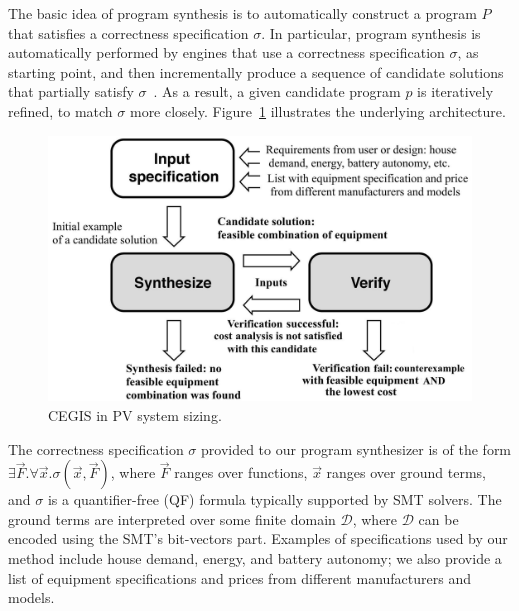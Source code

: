 \documentclass[runningheads]{llncs}
\begin{document}

The basic idea of program synthesis is to automatically construct a program $P$ that satisfies a correctness specification $\sigma$. In particular, program synthesis is automatically performed by engines that use a correctness specification $\sigma$, as starting point, and then incrementally produce a sequence of candidate solutions that partially satisfy $\sigma$~\cite{Abateetal2017}. As a result, a given candidate program $p$ is iteratively refined, to match $\sigma$ more closely. 
Figure~\ref{Counter-Example-Guided-Inductive-Synthesis} illustrates the underlying architecture. 
%
\begin{figure}
\begin{center}
	\includegraphics[width=0.5\columnwidth]{fig2_rev2.jpg}
\end{center}	
	\caption{CEGIS in PV system sizing.}
	\label{Counter-Example-Guided-Inductive-Synthesis}
\end{figure}

The correctness specification $\sigma$ provided to our program synthesizer is of the form $\exists \vec{F} . \forall \vec{x}. \sigma(\vec{x}, \vec{F})$, where $\vec{F}$ ranges over functions, $\vec{x}$ ranges over ground terms, and $\sigma$ is a quantifier-free (QF) formula typically supported by SMT solvers. The ground terms are interpreted over some finite domain $\mathcal{D}$, where $\mathcal{D}$ can be encoded using the SMT's bit-vectors part. Examples of specifications used by our method include house demand, energy, and battery autonomy; we also provide a list of equipment specifications and prices from different manufacturers and models.
\end{document}

